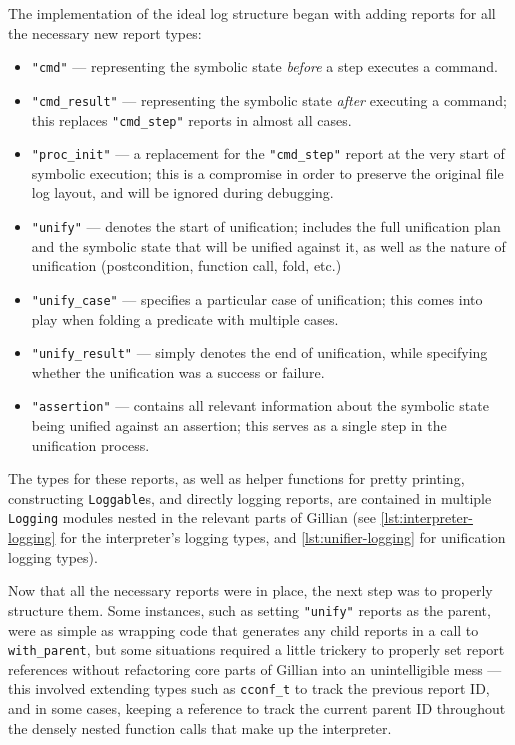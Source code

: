 The implementation of the ideal log structure began with adding reports for
all the necessary new report types:
\begin{itemize}
  \item \texttt{"cmd"} --- representing the symbolic state \textit{before} a
        step executes a command.
  \item \texttt{"cmd\_result"} --- representing the symbolic state
        \textit{after} executing a command; this replaces \texttt{"cmd\_step"}
        reports in almost all cases.
  \item \texttt{"proc\_init"} --- a replacement for the \texttt{"cmd\_step"}
        report at the very start of symbolic execution; this is a compromise
        in order to preserve the original file log layout, and will be ignored
        during debugging.
  \item \texttt{"unify"} --- denotes the start of unification; includes the
        full unification plan and the symbolic state that will be unified
        against it, as well as the nature of unification (postcondition,
        function call, fold, etc.)
  \item \texttt{"unify\_case"} --- specifies a particular case of unification;
        this comes into play when folding a predicate with multiple cases.
  \item \texttt{"unify\_result"} --- simply denotes the end of unification,
        while specifying whether the unification was a success or failure.
  \item \texttt{"assertion"} --- contains all relevant information about the
        symbolic state being unified against an assertion; this serves as a
        single step in the unification process.
\end{itemize}

The types for these reports, as well as helper functions for pretty printing,
constructing \texttt{Loggable}s, and directly logging reports, are contained
in multiple \texttt{Logging} modules nested in the relevant parts of Gillian
(see \autoref{lst:interpreter-logging} for the interpreter's logging types, and
\autoref{lst:unifier-logging} for unification logging types).

Now that all the necessary reports were in place, the next step was to properly
structure them. Some instances, such as setting \texttt{"unify"} reports as the
parent, were as simple as wrapping code that generates any child reports in a
call to \texttt{with\_parent}, but some situations required a little trickery
to properly set report references without refactoring core parts of Gillian into
an unintelligible mess --- this involved extending types such as
\texttt{cconf\_t} to track the previous report ID, and in some cases, keeping a
reference to track the current parent ID throughout the densely nested function
calls that make up the interpreter.

